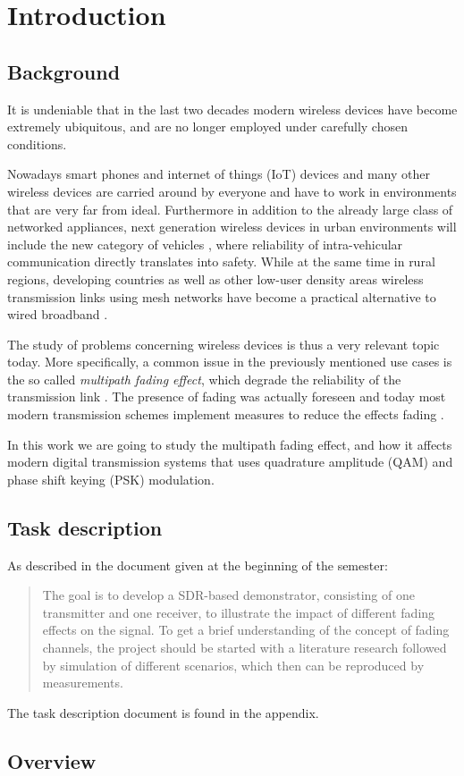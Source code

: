 
\chapter{Introduction}

\section{Background}

It is undeniable that in the last two decades modern wireless devices have become extremely ubiquitous, and are no longer employed under carefully chosen conditions.

Nowadays smart phones and internet of things (IoT) devices and many other wireless devices are carried around by everyone and have to work in environments that are very far from ideal. Furthermore in addition to the already large class of networked appliances, next generation wireless devices in urban environments will include the new category of vehicles \cite{AntonescuTB17}, where reliability of intra-vehicular communication directly translates into safety. While at the same time in rural regions, developing countries as well as other low-user density areas wireless transmission links using mesh networks have become a practical alternative to wired broadband \cite{Macmillan2019tidal,Subramanian2006rethinking,Flickenger2007wireless}.

The study of problems concerning wireless devices is thus a very relevant topic today. More specifically, a common issue in the previously mentioned use cases is the so called \emph{multipath fading effect}, which degrade the reliability of the transmission link \cite{Mathis, Gallager}. The presence of fading was actually foreseen \cite{Frederiksen2002overview,Maddocks1993introduction} and today most modern transmission schemes implement measures to reduce the effects fading \cite{Mathis,Hsu}.

In this work we are going to study the multipath fading effect, and how it affects modern digital transmission systems that uses quadrature amplitude (QAM) and phase shift keying (PSK) modulation.

\section{Task description}

As described in the document given at the beginning of the semester:
\begin{quote}
	The goal is to develop a SDR-based demonstrator, consisting of one transmitter and one receiver, to illustrate the impact of different fading effects on the signal. To get a brief understanding of the concept of fading channels, the project should be started with a literature research followed by simulation of different scenarios, which then can be reproduced by measurements.
\end{quote}
The task description document is found in the appendix.

\section{Overview}

